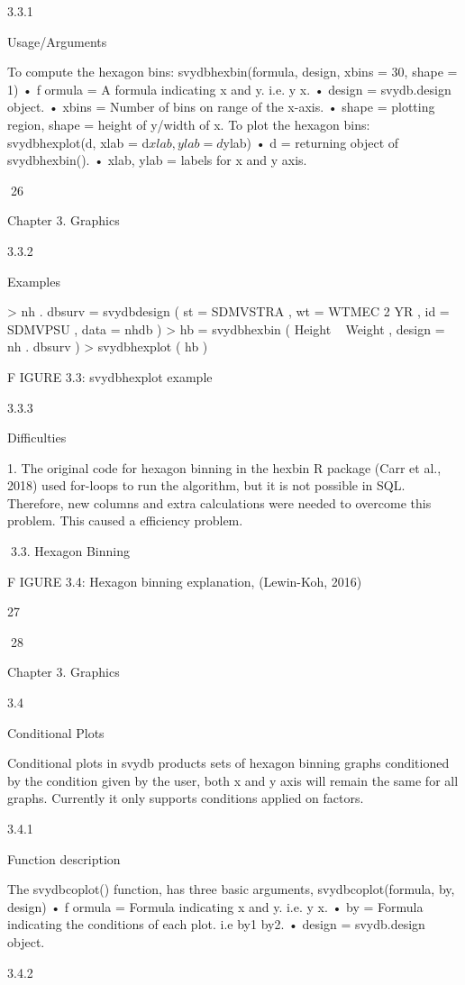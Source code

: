 3.3.1

Usage/Arguments

To compute the hexagon bins:
svydbhexbin(formula, design, xbins = 30, shape = 1)
• f ormula = A formula indicating x and y. i.e. y x.
• design = svydb.design object.
• xbins = Number of bins on range of the x-axis.
• shape = plotting region, shape = height of y/width of x.
To plot the hexagon bins:
svydbhexplot(d, xlab = d$xlab, ylab = d$ylab)
• d = returning object of svydbhexbin().
• xlab, ylab = labels for x and y axis.

26

Chapter 3. Graphics

3.3.2

Examples

> nh . dbsurv = svydbdesign ( st = SDMVSTRA , wt = WTMEC 2 YR ,
id = SDMVPSU , data = nhdb )
> hb = svydbhexbin ( Height ~ Weight , design = nh . dbsurv )
> svydbhexplot ( hb )

F IGURE 3.3: svydbhexplot example

3.3.3

Difficulties

1. The original code for hexagon binning in the hexbin R package (Carr et al.,
2018) used for-loops to run the algorithm, but it is not possible in SQL. Therefore, new columns and extra calculations were needed to overcome this problem. This caused a efficiency problem.

3.3. Hexagon Binning

F IGURE 3.4: Hexagon binning explanation, (Lewin-Koh, 2016)

27

28

Chapter 3. Graphics

3.4

Conditional Plots

Conditional plots in svydb products sets of hexagon binning graphs conditioned by
the condition given by the user, both x and y axis will remain the same for all graphs.
Currently it only supports conditions applied on factors.

3.4.1

Function description

The svydbcoplot() function, has three basic arguments,
svydbcoplot(formula, by, design)
• f ormula = Formula indicating x and y. i.e. y x.
• by = Formula indicating the conditions of each plot. i.e by1 by2.
• design = svydb.design object.

3.4.2

